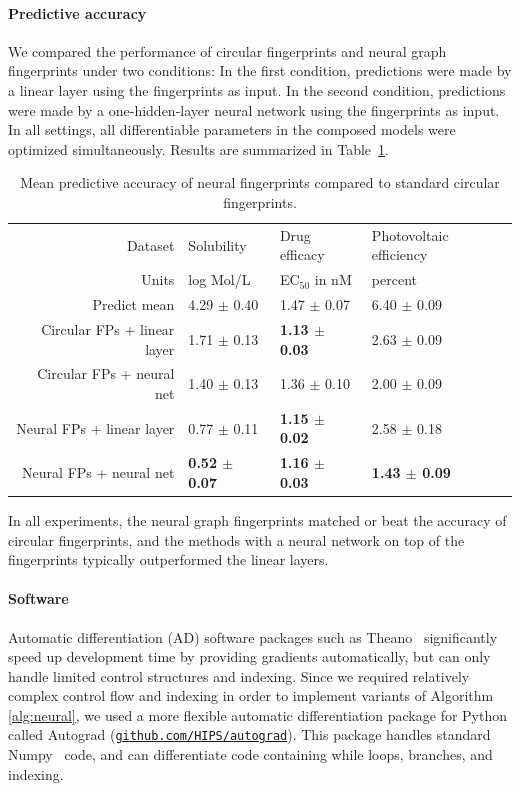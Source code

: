 \documentclass{article}
\newcommand{\citep}{\cite}
\newcommand{\citet}{\cite}
\begin{document}
\paragraph{Predictive accuracy}
We compared the performance of circular fingerprints and neural graph fingerprints under two conditions:
In the first condition, predictions were made by a linear layer using the fingerprints as input.
In the second condition, predictions were made by a one-hidden-layer neural network using the fingerprints as input.
In all settings, all differentiable parameters in the composed models were optimized simultaneously.
Results are summarized in Table~\ref{table:main results}.
%
\begin{table}
\begin{center}
\begin{tabular}{r|lll}
Dataset                      &   Solubility \citet{delaney_data_2004} & Drug efficacy \citet{gamo2010thousands} & Photovoltaic efficiency \citet{hachmann2011harvard} \\
Units                        &   log Mol/L                            & EC$_{50}$ in nM                        & percent \\
\midrule
Predict mean                 & 4.29 $\pm$ 0.40        & 1.47 $\pm$ 0.07         & 6.40 $\pm$ 0.09 \\
Circular FPs + linear layer  & 1.71 $\pm$ 0.13        & \bf{1.13} $\pm$ 0.03    & 2.63 $\pm$ 0.09 \\
Circular FPs + neural net    & 1.40 $\pm$ 0.13        & 1.36 $\pm$ 0.10         & 2.00 $\pm$ 0.09 \\ 
Neural FPs + linear layer    & 0.77 $\pm$ 0.11        & \bf{1.15} $\pm$ 0.02    & 2.58 $\pm$ 0.18 \\  
Neural FPs + neural net      & \bf{0.52} $\pm$ 0.07   & \bf{1.16} $\pm$ 0.03    & \bf{1.43} $\pm$ 0.09
\end{tabular}
\label{table:main results}
\caption{Mean predictive accuracy of neural fingerprints compared to standard circular fingerprints.}
\end{center}
\end{table}
%

In all experiments, the neural graph fingerprints matched or beat the accuracy of circular fingerprints, and the methods with a neural network on top of the fingerprints typically outperformed the linear layers.

\paragraph{Software}
Automatic differentiation (AD) software packages such as Theano~\citep{Bastien-Theano-2012} significantly speed up development time by providing gradients automatically, but can only handle limited control structures and indexing.
Since we required relatively complex control flow and indexing in order to implement variants of Algorithm \ref{alg:neural}, we used a more flexible automatic differentiation package for Python called Autograd (\href{http://github.com/HIPS/autograd}{\texttt{github.com/HIPS/autograd}}).
This package handles standard Numpy~\citep{oliphant2007python} code, and can differentiate code containing while loops, branches, and indexing.
\end{document}
